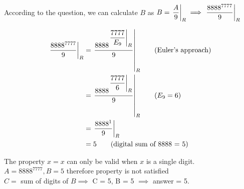 
According to the question, we can calculate $B$ as $B = \displaystyle{ \left. \frac{A}{9} \right |_{R} } \implies \displaystyle{ \left. \frac{8888^{7777}}{9} \right |_{R} }$

\begin{align*}
    \displaystyle{ \left. \frac{8888^{7777}}{9} \right |_{R} } & =\displaystyle{ \left. \frac{8888^{ \displaystyle{ \left. \frac{7777}{E_9} \right |_{R} }}}{9} \right |_{R} } \tag{Euler's approach} \\
    & =\displaystyle{ \left. \frac{8888^{ \displaystyle{ \left. \frac{7777}{6} \right |_{R} }}}{9} \right |_{R} } \tag{$E_9 = 6$} \\
    & =\displaystyle{ \left. \frac{8888^{1}}{9} \right |_{R} } \\
    & = 5 \tag{digital sum of 8888 = 5} \\
\end{align*}

The property $x = x$ can only be valid when $x$ is a single digit. $A = 8888^{7777}, B = 5$ therefore property is not satisfied \\

$C = $ sum of digits of $B \implies$ C = 5, B = 5 $\implies$ answer = 5.
